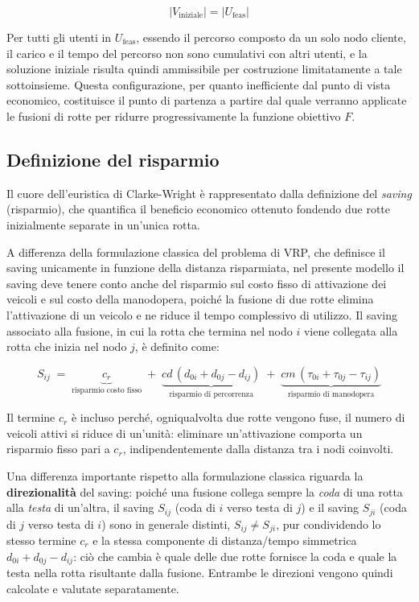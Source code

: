 \[
|V_{\text{iniziale}}| = |U_{\text{feas}}|
\]

Per tutti gli utenti in $U_{\text{feas}}$, essendo il percorso composto da un solo nodo cliente, il carico e il tempo del percorso non sono cumulativi con altri utenti, e la soluzione iniziale risulta quindi ammissibile per costruzione limitatamente a tale sottoinsieme. Questa configurazione, per quanto inefficiente dal punto di vista economico, costituisce il punto di partenza a partire dal quale verranno applicate le fusioni di rotte per ridurre progressivamente la funzione obiettivo $F$.

\subsection{Definizione del risparmio}

Il cuore dell'euristica di Clarke-Wright è rappresentato dalla definizione del \emph{saving} (risparmio), che quantifica il beneficio economico ottenuto fondendo due rotte inizialmente separate in un'unica rotta.

A differenza della formulazione classica del problema di VRP, che definisce il saving unicamente in funzione della distanza risparmiata, nel presente modello il saving deve tenere conto anche del risparmio sul costo fisso di attivazione dei veicoli e sul costo della manodopera, poiché la fusione di due rotte elimina l'attivazione di un veicolo e ne riduce il tempo complessivo di utilizzo. Il saving associato alla fusione, in cui la rotta che termina nel nodo $i$ viene collegata alla rotta che inizia nel nodo $j$, è definito come:

\begin{equation}
	S_{ij} \;=\; \underbrace{c_r}_{\text{risparmio costo fisso}} \;+\; \underbrace{cd\,(d_{0i}+d_{0j}-d_{ij})}_{\text{risparmio di percorrenza}} \;+\; \underbrace{cm\,(\tau_{0i}+\tau_{0j}-\tau_{ij})}_{\text{risparmio di manodopera}}
	\label{eq:saving-completo}
\end{equation}

Il termine $c_r$ è incluso perché, ogniqualvolta due rotte vengono fuse, il numero di veicoli attivi si riduce di un'unità: eliminare un'attivazione comporta un risparmio fisso pari a $c_r$, indipendentemente dalla distanza tra i nodi coinvolti.

Una differenza importante rispetto alla formulazione classica riguarda la \textbf{direzionalità} del saving: poiché una fusione collega sempre la \emph{coda} di una rotta alla \emph{testa} di un'altra, il saving $S_{ij}$ (coda di $i$ verso testa di $j$) e il saving $S_{ji}$ (coda di $j$ verso testa di $i$) sono in generale distinti, $S_{ij} \neq S_{ji}$, pur condividendo lo stesso termine $c_r$ e la stessa componente di distanza/tempo simmetrica $d_{0i}+d_{0j}-d_{ij}$: ciò che cambia è quale delle due rotte fornisce la coda e quale la testa nella rotta risultante dalla fusione. Entrambe le direzioni vengono quindi calcolate e valutate separatamente.

